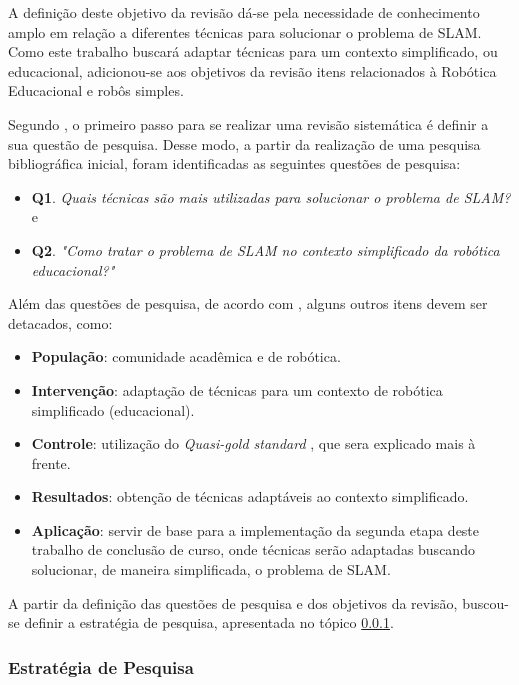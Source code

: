 		A definição deste objetivo da revisão dá-se pela necessidade de conhecimento amplo em relação a diferentes técnicas para solucionar o problema de SLAM. Como este trabalho buscará adaptar técnicas para um contexto simplificado, ou educacional, adicionou-se aos objetivos da revisão itens relacionados à Robótica Educacional e robôs simples.

		Segundo \cite{Kitchenham}, o primeiro passo para se realizar uma revisão sistemática é definir a sua questão de pesquisa. Desse modo, a partir da realização de uma pesquisa bibliográfica inicial, foram identificadas as seguintes questões de pesquisa:

		\begin{itemize}
			\item \textbf{Q1}. \textit{Quais técnicas são mais utilizadas para solucionar o problema de SLAM?} e
			\item \textbf{Q2}. \textit{"Como tratar o problema de SLAM no contexto simplificado da robótica educacional?"}
		\end{itemize}

		Além das questões de pesquisa, de acordo com \cite{exemploRevisaoSistematica}, alguns outros itens devem ser detacados, como:

		\begin{itemize}
			\item \textbf{População}: comunidade acadêmica e de robótica.
			\item \textbf{Intervenção}: adaptação de técnicas para um contexto de robótica simplificado (educacional).
			\item \textbf{Controle}: utilização do \textit{Quasi-gold standard} \cite{Kitchenham}, que sera explicado mais à frente.
			\item \textbf{Resultados}: obtenção de técnicas adaptáveis ao contexto simplificado.
			\item \textbf{Aplicação}: servir de base para a implementação da segunda etapa deste trabalho de conclusão de curso, onde técnicas serão adaptadas buscando solucionar, de maneira simplificada, o problema de SLAM.

		\end{itemize}

		A partir da definição das questões de pesquisa e dos objetivos da revisão, buscou-se definir a estratégia de pesquisa, apresentada no tópico \ref{sub:estrategias_pesquisa}.

		\subsubsection{Estratégia de Pesquisa}
		\label{sub:estrategias_pesquisa}

